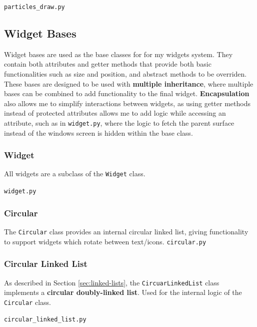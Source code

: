\documentclass[../main/main.tex]{subfiles}
\begin{document}
\noindent\verb|particles_draw.py|


\subsection{Widget Bases}
\label{sec:widget-bases}
Widget bases are used as the base classes for for my widgets system. They contain both attributes and getter methods that provide both basic functionalities such as size and position, and abstract methods to be overriden. These bases are designed to be used with \textbf{multiple inheritance}, where multiple bases can be combined to add functionality to the final widget. \textbf{Encapsulation} also allows me to simplify interactions between widgets, as using getter methods instead of protected attributes allows me to add logic while accessing an attribute, such as in \verb|widget.py|, where the logic to fetch the parent surface instead of the windows screen is hidden within the base class.

\subsubsection*{Widget}
\noindent All widgets are a subclass of the \lstinline{Widget} class.

\noindent\verb|widget.py|


\subsubsection*{Circular}
\noindent The \lstinline{Circular} class provides an internal circular linked list, giving functionality to support widgets which rotate between text/icons.
\noindent\verb|circular.py|


\subsubsection*{Circular Linked List}
\label{sec:linked-list}
As described in Section \ref{sec:linked-lists}, the \lstinline{CircuarLinkedList} class implements a \textbf{circular doubly-linked list}. Used for the internal logic of the \lstinline{Circular} class.

\noindent\verb|circular_linked_list.py|

\end{document}
